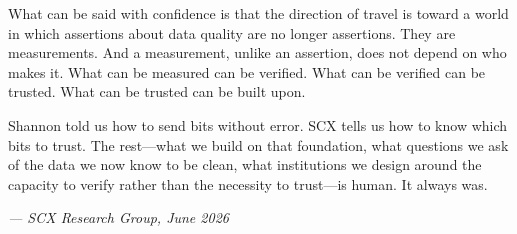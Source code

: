 \documentclass[12pt,a4paper]{article}
\begin{document}
What can be said with confidence is that the direction of travel is toward a world in which assertions about data quality are no longer assertions. They are measurements. And a measurement, unlike an assertion, does not depend on who makes it. What can be measured can be verified. What can be verified can be trusted. What can be trusted can be built upon.

Shannon told us how to send bits without error. SCX tells us how to know which bits to trust. The rest---what we build on that foundation, what questions we ask of the data we now know to be clean, what institutions we design around the capacity to verify rather than the necessity to trust---is human. It always was.

\bigskip

\begin{flushright}
\itshape
--- SCX Research Group, June 2026
\end{flushright}
\end{document}
